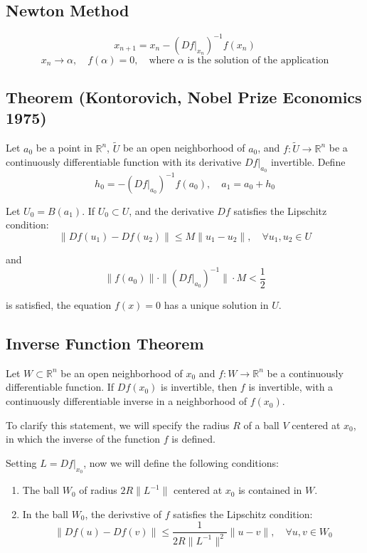 \documentclass[11pt]{article}
\begin{document}
\subsection{Newton Method}
\[
x_{n+1} = x_n - (Df\big|_{x_n})^{-1} f(x_n)
\]
\[
x_n \rightarrow \alpha, \quad f(\alpha) = 0, \quad \text{where } \alpha \text{ is the solution of the application}
\]

\subsection{Theorem (Kontorovich, Nobel Prize Economics 1975)}
Let $a_0$ be a point in $\mathbb{R}^n$, $\tilde{U}$ be an open neighborhood of $a_0$, and $f : \tilde{U} \rightarrow \mathbb{R}^n$ be a continuously differentiable function with its derivative $Df\big|_{a_0}$ invertible. Define 
\[
h_0 = - (Df\big|_{a_0})^{-1} f(a_0), \quad a_1 = a_0 + h_0
\]

Let $U_0 = B(a_1)$. If $U_0 \subset U$, and the derivative $Df$ satisfies the Lipschitz condition: 
\[
\| Df(u_1) - Df(u_2) \| \leq M \| u_1 - u_2 \|, \quad \forall u_1, u_2 \in U
\]

and
\[
\|f(a_0)\| \cdot \| (Df\big|_{a_0})^{-1} \| \cdot M < \frac{1}{2}
\]

is satisfied, the equation $f(x) = 0$ has a unique solution in $U$.

\subsection{Inverse Function Theorem}
Let $W \subset \mathbb{R}^n$ be an open neighborhood of $x_0$ and $f : W \rightarrow \mathbb{R}^n$ be a continuously differentiable function. If $Df(x_0)$ is invertible, then $f$ is invertible, with a continuously differentiable inverse in a neighborhood of $f(x_0)$.

To clarify this statement, we will specify the radius $R$ of a ball $V$ centered at $x_0$, in which the inverse of the function $f$ is defined.

Setting $L = Df\big|_{x_0}$, now we will define the following conditions:
\begin{enumerate}
    \item The ball $W_0$ of radius $2R \| L^{-1} \|$ centered at $x_0$ is contained in $W$.
    \item In the ball $W_0$, the derivstive of $f$ satisfies the Lipschitz condition:
    \[
    \|Df(u) - Df(v)\| \leq \frac{1}{2R \|L^{-1}\|^2} \|u - v\|, \quad \forall u,v \in W_0
    \]
\end{enumerate}
\end{document}
